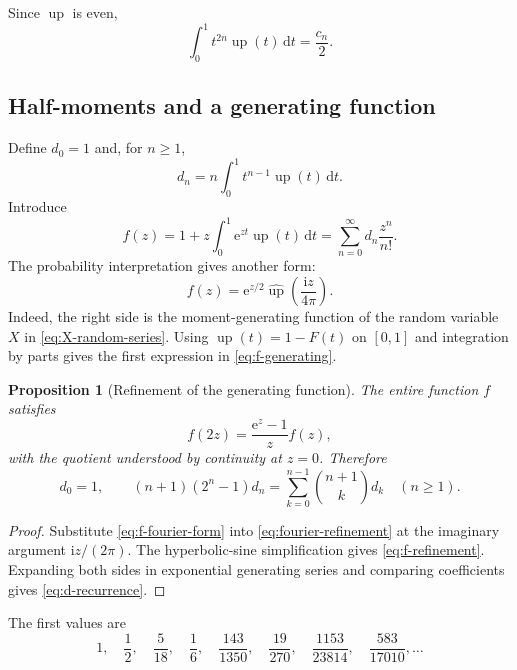 \documentclass[11pt]{article}
\numberwithin{equation}{section}
\newtheorem{proposition}[theorem]{Proposition}
\theoremstyle{definition}
\theoremstyle{remark}
\newcommand{\dd}{\,\mathrm{d}}
\newcommand{\e}{\mathrm{e}}
\newcommand{\ii}{\mathrm{i}}
\newcommand{\upf}{\operatorname{up}}
\begin{document}
Since $\upf$ is even,
\begin{equation}\label{eq:half-even-moment}
 \int_0^1t^{2n}\upf(t)\dd t=\frac{c_n}{2}.
\end{equation}

\subsection{Half-moments and a generating function}

Define $d_0=1$ and, for $n\ge1$,
\begin{equation}\label{eq:d-integral}
 d_n=n\int_0^1t^{n-1}\upf(t)\dd t.
\end{equation}
Introduce
\begin{equation}\label{eq:f-generating}
 f(z)=1+z\int_0^1\e^{zt}\upf(t)\dd t
     =\sum_{n=0}^{\infty}d_n\frac{z^n}{n!}.
\end{equation}
The probability interpretation gives another form:
\begin{equation}\label{eq:f-fourier-form}
 f(z)=\e^{z/2}\widehat{\upf}\left(\frac{\ii z}{4\pi}\right).
\end{equation}
Indeed, the right side is the moment-generating function of the random
variable $X$ in \eqref{eq:X-random-series}.  Using
$\upf(t)=1-F(t)$ on $[0,1]$ and integration by parts gives the first
expression in \eqref{eq:f-generating}.

\begin{proposition}[Refinement of the generating function]
\label{prop:f-refinement}
The entire function $f$ satisfies
\begin{equation}\label{eq:f-refinement}
 f(2z)=\frac{\e^z-1}{z}f(z),
\end{equation}
with the quotient understood by continuity at $z=0$.  Therefore
\begin{equation}\label{eq:d-recurrence}
 d_0=1,
 \qquad
 (n+1)(2^n-1)d_n
 =\sum_{k=0}^{n-1}\binom{n+1}{k}d_k
 \quad(n\ge1).
\end{equation}
\end{proposition}

\begin{proof}
Substitute \eqref{eq:f-fourier-form} into
\eqref{eq:fourier-refinement} at the imaginary argument $\ii z/(2\pi)$.
The hyperbolic-sine simplification gives \eqref{eq:f-refinement}.  Expanding
both sides in exponential generating series and comparing coefficients gives
\eqref{eq:d-recurrence}.
\end{proof}

The first values are
\begin{equation}\label{eq:d-first}
 1,\quad\frac12,\quad\frac5{18},\quad\frac16,\quad
 \frac{143}{1350},\quad\frac{19}{270},\quad
 \frac{1153}{23814},\quad\frac{583}{17010},\ldots
\end{equation}
\end{document}
